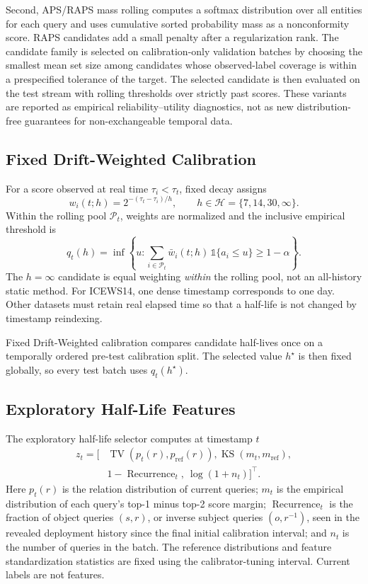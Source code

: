 \documentclass[10pt,twocolumn]{article}
\newcommand{\TV}{\operatorname{TV}}
\newcommand{\KS}{\operatorname{KS}}
\newcommand{\Rec}{\operatorname{Recurrence}}
\begin{document}
Second, APS/RAPS mass rolling computes a softmax distribution over all entities
for each query and uses cumulative sorted probability mass as a nonconformity
score. RAPS candidates add a small penalty after a regularization rank. The
candidate family is selected on calibration-only validation batches by choosing
the smallest mean set size among candidates whose observed-label coverage is
within a prespecified tolerance of the target. The selected candidate is then
evaluated on the test stream with rolling thresholds over strictly past scores.
These variants are reported as empirical reliability--utility diagnostics, not
as new distribution-free guarantees for non-exchangeable temporal data.

\subsection{Fixed Drift-Weighted Calibration}

For a score observed at real time \(\tau_i<\tau_t\), fixed decay assigns
\[
  w_i(t;h)=2^{-(\tau_t-\tau_i)/h},
  \qquad h\in\mathcal{H}=\{7,14,30,\infty\}.
\]
Within the rolling pool \(\mathcal{P}_t\), weights are normalized and the
inclusive empirical threshold is
\[
  q_t(h)=\inf\left\{u:
  \sum_{i\in\mathcal{P}_t}\bar{w}_i(t;h)\,
  \mathbb{1}\{a_i\leq u\}\geq 1-\alpha\right\}.
\]
The \(h=\infty\) candidate is equal weighting \emph{within} the rolling pool,
not an all-history static method. For ICEWS14, one dense timestamp corresponds
to one day. Other datasets must retain real elapsed time so that a half-life is
not changed by timestamp reindexing.

Fixed Drift-Weighted calibration compares candidate half-lives once on a
temporally ordered pre-test calibration split. The selected value \(h^\star\)
is then fixed globally, so every test batch uses \(q_t(h^\star)\).



\subsection{Exploratory Half-Life Features}

The exploratory half-life selector computes at timestamp \(t\)
\[
\begin{aligned}
  z_t=\big[&\TV(p_t(r),p_{\mathrm{ref}}(r)),
  \KS(m_t,m_{\mathrm{ref}}),\\
  &1-\Rec_t,\ \log(1+n_t)\big]^{\top}.
\end{aligned}
\]
Here \(p_t(r)\) is the relation distribution of current queries;
\(m_t\) is the empirical distribution of each query's top-1 minus top-2 score
margin; \(\Rec_t\) is the fraction of object queries \((s,r)\), or inverse
subject queries \((o,r^{-1})\), seen in the revealed deployment history since
the final initial calibration interval; and
\(n_t\) is the number of queries in the batch. The reference distributions and
feature standardization statistics are fixed using the calibrator-tuning
interval. Current labels are not features.
\end{document}
